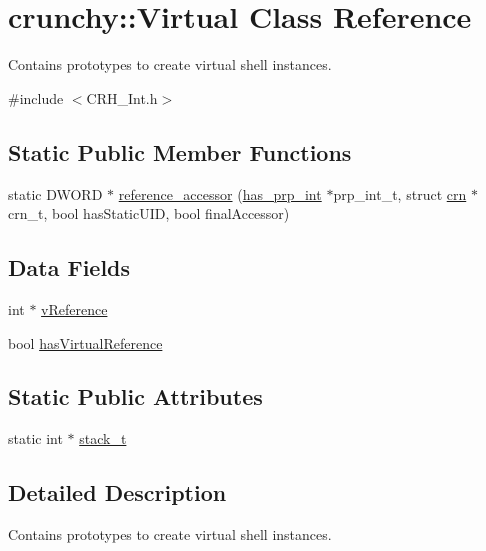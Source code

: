\hypertarget{classcrunchy_1_1_virtual}{}\section{crunchy\+:\+:Virtual Class Reference}
\label{classcrunchy_1_1_virtual}


Contains prototypes to create virtual shell instances.  




{\ttfamily \#include $<$C\+R\+H\+\_\+\+Int.\+h$>$}

\subsection*{Static Public Member Functions}
\begin{DoxyCompactItemize}
\item 
static D\+W\+O\+RD $\ast$ \hyperlink{classcrunchy_1_1_virtual_a5021e8883bb9698a2f6018323b68355f}{reference\+\_\+accessor} (\hyperlink{structcrunchy_1_1has__prp__int}{has\+\_\+prp\+\_\+int} $\ast$prp\+\_\+int\+\_\+t, struct \hyperlink{structcrunchy_1_1crn}{crn} $\ast$crn\+\_\+t, bool has\+Static\+U\+ID, bool final\+Accessor)
\end{DoxyCompactItemize}
\subsection*{Data Fields}
\begin{DoxyCompactItemize}
\item 
int $\ast$ \hyperlink{classcrunchy_1_1_virtual_acf317286283a3916ccb1d4752074af5f}{v\+Reference}
\item 
bool \hyperlink{classcrunchy_1_1_virtual_a9dd9b11712ab44b00696838fc1da2c43}{has\+Virtual\+Reference}
\end{DoxyCompactItemize}
\subsection*{Static Public Attributes}
\begin{DoxyCompactItemize}
\item 
static int $\ast$ \hyperlink{classcrunchy_1_1_virtual_ad108e31577fcad0d6ff9ff6d7b3d5249}{stack\+\_\+t}
\end{DoxyCompactItemize}


\subsection{Detailed Description}
Contains prototypes to create virtual shell instances. 

